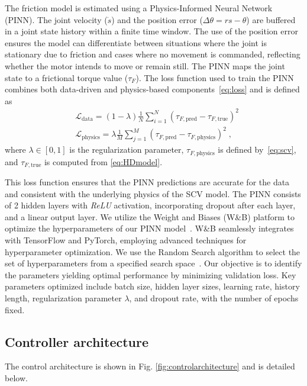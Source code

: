 The friction model is estimated using a Physics-Informed Neural Network (PINN). The joint velocity ($\dot{s}$) and the position error ($\Delta \theta = r s - \theta$) are buffered in a joint state history within a finite time window. The use of the position error ensures the model can differentiate between situations where the joint is stationary due to friction and cases where no movement is commanded, reflecting whether the motor intends to move or remain still. The PINN maps the joint state to a frictional torque value ($\tau_F$).
The loss function used to train the PINN combines both data-driven and physics-based components~\eqref{eq:loss} and is defined as
\begin{equation}
\begin{aligned}
&\mathcal{L}_{\text{data}} =  (1 - \lambda) \frac{1}{N} \sum_{i=1}^{N} \left( \tau_{F, \text{pred}} - \tau_{F, \text{true}} \right)^2 \\
&\mathcal{L}_{\text{physics}} = \lambda \frac{1}{M} \sum_{j=1}^{M} \left( \tau_{F, \text{pred}} - \tau_{F, \text{physics}} \right)^2 \; ,
\end{aligned}
\label{eq:combined_loss}
\end{equation}
where $\lambda \in [0, 1]$ is the regularization parameter, $\tau_{F, \text{physics}}$ is defined by~\eqref{eq:scv}, and $\tau_{F, \text{true}}$ is computed from \eqref{eq:HDmodel}.

This loss function ensures that the PINN predictions are accurate for the data and consistent with the underlying physics of the SCV model. The PINN consists of 2 hidden layers with \textit{ReLU} activation, incorporating dropout after each layer, and a linear output layer. We utilize the Weight and Biases (W\&B) platform to optimize the hyperparameters of our PINN model~\cite{wandb}. W\&B seamlessly integrates with TensorFlow and PyTorch, employing advanced techniques for hyperparameter optimization. We use the Random Search algorithm to select the set of hyperparameters from a specified search space~\cite{bergstra2012random}. Our objective is to identify the parameters yielding optimal performance by minimizing validation loss. Key parameters optimized include batch size, hidden layer sizes, learning rate, history length, regularization parameter $\lambda$, and dropout rate, with the number of epochs fixed.

\subsection{Controller architecture}
The control architecture is shown in Fig. \ref{fig:controlarchitecture} and is detailed below.

